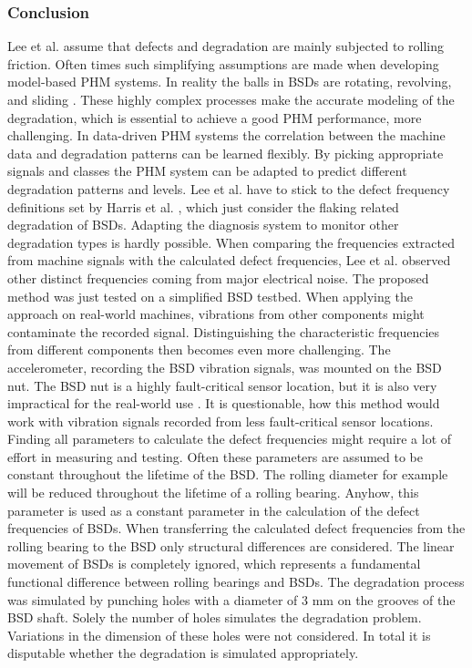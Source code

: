 \subsubsection{Conclusion}
Lee et al. \cite{Lee2015} assume that defects and degradation are mainly subjected to rolling friction. Often times such simplifying assumptions are made when developing model-based PHM systems. In reality the balls in BSDs are rotating, revolving, and sliding \cite{Lee2015}. These highly complex processes make the accurate modeling of the degradation, which is essential to achieve a good PHM performance, more challenging. In data-driven PHM systems the correlation between the machine data and degradation patterns can be learned flexibly. By picking appropriate signals and classes the PHM system can be adapted to predict different degradation patterns and levels. Lee et al. \cite{Lee2015} have to stick to the defect frequency definitions set by Harris et al. \cite{Harris1996}, which just consider the flaking related degradation of BSDs. Adapting the diagnosis system to monitor other degradation types is hardly possible. When comparing the frequencies extracted from machine signals with the calculated defect frequencies, Lee et al. observed other distinct frequencies coming from major electrical noise. The proposed method was just tested on a simplified BSD testbed. When applying the approach on real-world machines, vibrations from other components might contaminate the recorded signal. Distinguishing the characteristic frequencies from different components then becomes even more challenging. The accelerometer, recording the BSD vibration signals, was mounted on the BSD nut. The BSD nut is a highly fault-critical sensor location, but it is also very impractical for the real-world use \cite{Pandhare2021}. It is questionable, how this method would work with vibration signals recorded from less fault-critical sensor locations. Finding all parameters to calculate the defect frequencies might require a lot of effort in measuring and testing. Often these parameters are assumed to be constant throughout the lifetime of the BSD. The rolling diameter for example will be reduced throughout the lifetime of a rolling bearing. Anyhow, this parameter is used as a constant parameter in the calculation of the defect frequencies of BSDs. When transferring the calculated defect frequencies from the rolling bearing to the BSD only structural differences are considered. The linear movement of BSDs is completely ignored, which represents a fundamental functional difference between rolling bearings and BSDs. The degradation process was simulated by punching holes with a diameter of 3 mm on the grooves of the BSD shaft. Solely the number of holes simulates the degradation problem. Variations in the dimension of these holes were not considered. In total it is disputable whether the degradation is simulated appropriately.  

